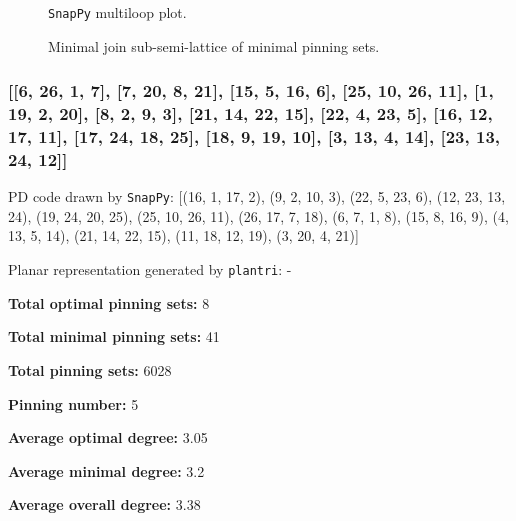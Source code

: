 \documentclass{article}%
\begin{document}
\begin{multicols}{2}
\begin{figure}[H]
\centering

\caption{\texttt{SnapPy} multiloop plot.}
\label{fig:tex/img/[[22, 7, 1, 8], [8, 13, 9, 14], [14, 21, 15, 22], [6, 26, 7, 23], [1, 12, 2, 13], [9, 20, 10, 21], [15, 24, 16, 23], [16, 5, 17, 6], [17, 25, 18, 26], [18, 11, 19, 12], [2, 19, 3, 20], [10, 3, 11, 4],.svg}
\end{figure}
\columnbreak

\begin{figure}[H]
\centering
\scalebox{0.8}{}
\caption{Minimal join sub-semi-lattice of minimal pinning sets.}
\label{fig:tex/img/[[22, 7, 1, 8], [8, 13, 9, 14], [14, 21, 15, 22], [6, 26, 7, 23], [1, 12, 2, 13], [9, 20, 10, 21], [15, 24, 16, 23], [16, 5, 17, 6], [17, 25, 18, 26], [18, 11, 19, 12], [2, 19, 3, 20], [10, 3, 11, 4],.pgf}
\end{figure}
\end{multicols}

\newpage

\subsubsection{[[6, 26, 1, 7], [7, 20, 8, 21], [15, 5, 16, 6], [25, 10, 26, 11], [1, 19, 2, 20], [8, 2, 9, 3], [21, 14, 22, 15], [22, 4, 23, 5], [16, 12, 17, 11], [17, 24, 18, 25], [18, 9, 19, 10], [3, 13, 4, 14], [23, 13, 24, 12]]}

{\small\noindent PD code drawn by \texttt{SnapPy}: [(16, 1, 17, 2), (9, 2, 10, 3), (22, 5, 23, 6), (12, 23, 13, 24), (19, 24, 20, 25), (25, 10, 26, 11), (26, 17, 7, 18), (6, 7, 1, 8), (15, 8, 16, 9), (4, 13, 5, 14), (21, 14, 22, 15), (11, 18, 12, 19), (3, 20, 4, 21)]}

{\small\noindent Planar representation generated by \texttt{plantri}: -}

\begin{multicols}{2}
{\normalsize \noindent\textbf{Total optimal pinning sets:} 8

\noindent\textbf{Total minimal pinning sets:} 41

\noindent\textbf{Total pinning sets:} 6028

\noindent\textbf{Pinning number:} 5

}
\columnbreak

{\normalsize \noindent\textbf{Average optimal degree:} 3.05

\noindent\textbf{Average minimal degree:} 3.2

\noindent\textbf{Average overall degree:} 3.38

}
\end{multicols}
\end{document}
